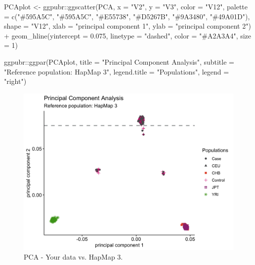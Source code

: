 \documentclass[
]{book}
\newenvironment{Shaded}{\begin{snugshade}}{\end{snugshade}}
\newcommand{\AttributeTok}[1]{\textcolor[rgb]{0.77,0.63,0.00}{#1}}
\newcommand{\DecValTok}[1]{\textcolor[rgb]{0.00,0.00,0.81}{#1}}
\newcommand{\FloatTok}[1]{\textcolor[rgb]{0.00,0.00,0.81}{#1}}
\newcommand{\FunctionTok}[1]{\textcolor[rgb]{0.00,0.00,0.00}{#1}}
\newcommand{\NormalTok}[1]{#1}
\newcommand{\OtherTok}[1]{\textcolor[rgb]{0.56,0.35,0.01}{#1}}
\newcommand{\SpecialCharTok}[1]{\textcolor[rgb]{0.00,0.00,0.00}{#1}}
\newcommand{\StringTok}[1]{\textcolor[rgb]{0.31,0.60,0.02}{#1}}
\begin{document}
\begin{Shaded}
\begin{Highlighting}[]
\NormalTok{PCAplot }\OtherTok{\textless{}{-}}\NormalTok{ ggpubr}\SpecialCharTok{::}\FunctionTok{ggscatter}\NormalTok{(PCA, }\AttributeTok{x =} \StringTok{"V2"}\NormalTok{, }\AttributeTok{y =} \StringTok{"V3"}\NormalTok{,}
                             \AttributeTok{color =} \StringTok{"V12"}\NormalTok{,}
                             \AttributeTok{palette =} \FunctionTok{c}\NormalTok{(}\StringTok{"\#595A5C"}\NormalTok{, }\StringTok{"\#595A5C"}\NormalTok{, }\StringTok{"\#E55738"}\NormalTok{, }\StringTok{"\#D5267B"}\NormalTok{, }\StringTok{"\#9A3480"}\NormalTok{, }\StringTok{"\#49A01D"}\NormalTok{),}
                             \AttributeTok{shape =} \StringTok{"V12"}\NormalTok{,}
                             \AttributeTok{xlab =} \StringTok{"principal component 1"}\NormalTok{, }\AttributeTok{ylab =} \StringTok{"principal component 2"}\NormalTok{) }\SpecialCharTok{+}
  \FunctionTok{geom\_hline}\NormalTok{(}\AttributeTok{yintercept =} \FloatTok{0.075}\NormalTok{, }\AttributeTok{linetype =} \StringTok{"dashed"}\NormalTok{,}
                \AttributeTok{color =} \StringTok{"\#A2A3A4"}\NormalTok{, }\AttributeTok{size =} \DecValTok{1}\NormalTok{)}

\NormalTok{  ggpubr}\SpecialCharTok{::}\FunctionTok{ggpar}\NormalTok{(PCAplot,}
                \AttributeTok{title =} \StringTok{"Principal Component Analysis"}\NormalTok{,}
                \AttributeTok{subtitle =} \StringTok{"Reference population: HapMap 3"}\NormalTok{,}
                \AttributeTok{legend.title =} \StringTok{"Populations"}\NormalTok{, }\AttributeTok{legend =} \StringTok{"right"}\NormalTok{)}
\end{Highlighting}
\end{Shaded}

\begin{figure}

{\centering \includegraphics[width=18.67in]{img/_gwas/pca-hapmap3} 

}

\caption{PCA - Your data vs. HapMap 3.}\label{fig:show-pca-hapmap3}
\end{figure}
\end{document}

